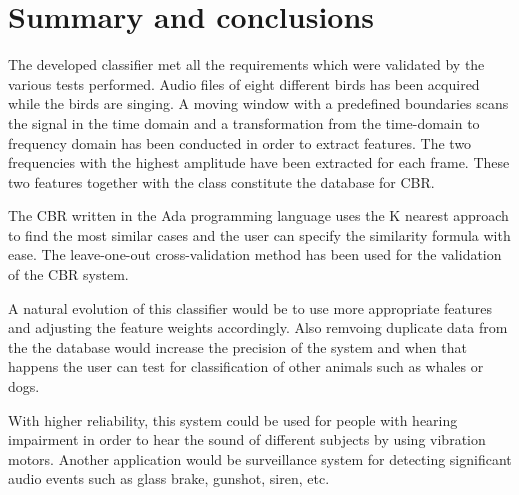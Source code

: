 \section{Summary and conclusions}
The developed classifier met all the requirements which were validated
by the various tests performed. Audio files of eight different birds has been
acquired while the birds are singing. A moving window
with a predefined boundaries scans the signal in the time domain and a transformation
from the time-domain to frequency domain has been conducted in order to extract features.
The two frequencies with the highest amplitude have been extracted for each frame.
These two features together with the class constitute the database for CBR.

The CBR written in the Ada programming language uses the K nearest approach to
find the most similar cases and the user can specify the similarity formula with ease.
The leave-one-out cross-validation method has been used for the validation of the CBR system.

A natural evolution of this classifier would be to use more appropriate features
and adjusting the feature weights accordingly. Also remvoing duplicate data from
the the database would increase the precision of the system and when that happens
the user can test for classification of other animals such as whales or dogs.

With higher reliability, this system could be used for people with hearing impairment
in order to hear the sound of different subjects by using vibration motors. Another application
would be surveillance system for detecting significant
audio events such as glass brake, gunshot, siren, etc.
